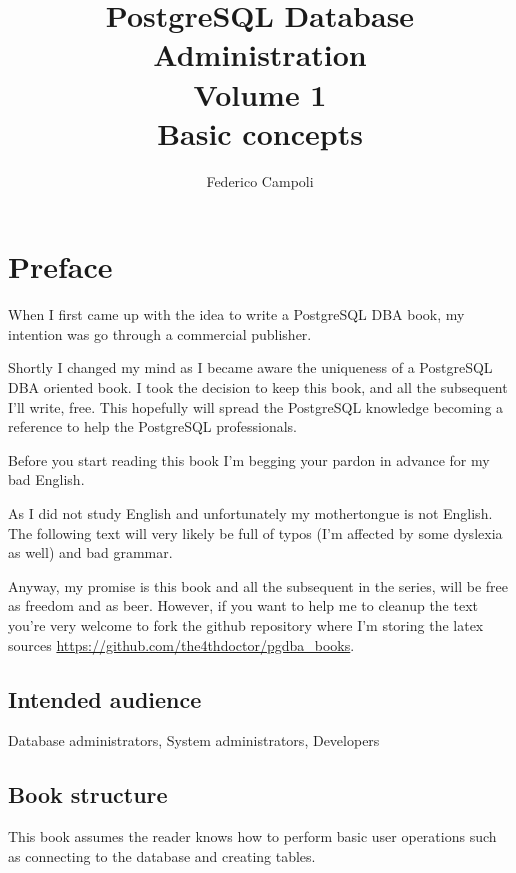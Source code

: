 \documentclass[oneside]{book}
\author{Federico Campoli}
\title{PostgreSQL Database Administration \\ Volume 1 \\ Basic concepts}
\begin{document}

\maketitle

\newpage{}



\tableofcontents{}

\chapter*{Preface}
When I first came up with the idea to write a PostgreSQL DBA book, my intention was go 
through a commercial publisher.\newline

Shortly I changed my mind as I became aware the uniqueness of a PostgreSQL DBA oriented book.
I took the decision to keep this book, and all the subsequent I'll write, free. This 
hopefully will spread the PostgreSQL knowledge becoming a reference to help the 
PostgreSQL professionals.\newline

Before you start reading this book I'm begging your pardon in advance for my bad English.\newline

As I did not study English and unfortunately my mothertongue is not English. The following text 
will very likely be full of typos (I'm affected by some dyslexia as well) and bad grammar.\newline

Anyway, my promise  is this book and all the subsequent in the series, will be free as freedom 
and as beer.\newline
However, if you want to help me to cleanup the text you're very welcome to fork the github 
repository where I'm storing the latex sources \href{https://github.com/the4thdoctor/pgdba\_books}{
https://github.com/the4thdoctor/pgdba\_books}.\newline




\section*{Intended audience}
Database administrators, System administrators, Developers

\section*{Book structure}
This book assumes the reader knows how to perform basic user operations such as
connecting to the database and creating tables.
\end{document}
